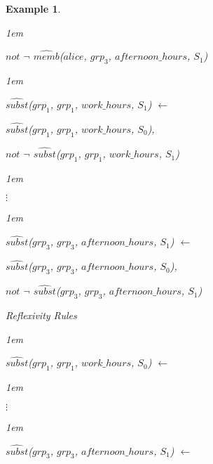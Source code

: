 \documentclass[11pt]{report}
\newtheorem{vexample}{Example}[chapter]
\newenvironment{vquote}
{
  \begin{list}{}{\leftmargin 1em}\item[]
}
{
  \end{list}
}
\begin{document}
\begin{vexample}
\begin{enumerate}
\begin{vquote}
                \hspace{1em}
                $not$ $\lnot$ $\hat{memb}$($alice$, $grp_3$, $afternoon\_hours$, $S_1$)
              \end{vquote}

              \begin{vquote}
                $\hat{subst}$($grp_1$, $grp_1$, $work\_hours$, $S_1$) $\leftarrow$

                \hspace{1em}
                $\hat{subst}$($grp_1$, $grp_1$, $work\_hours$, $S_0$),

                \hspace{1em}
                $not$ $\lnot$ $\hat{subst}$($grp_1$, $grp_1$, $work\_hours$, $S_1$)
              \end{vquote}

              \begin{vquote}
                \hspace{1em}
                $\vdots$
              \end{vquote}

              \begin{vquote}
                $\hat{subst}$($grp_3$, $grp_3$, $afternoon\_hours$, $S_1$) $\leftarrow$

                \hspace{1em}
                $\hat{subst}$($grp_3$, $grp_3$, $afternoon\_hours$, $S_0$),

                \hspace{1em}
                $not$ $\lnot$ $\hat{subst}$($grp_3$, $grp_3$, $afternoon\_hours$, $S_1$)
              \end{vquote}

            \item
              Reflexivity Rules

              \begin{vquote}
                $\hat{subst}$($grp_1$, $grp_1$, $work\_hours$, $S_0$) $\leftarrow$
              \end{vquote}

              \begin{vquote}
                \hspace{1em}
                $\vdots$
              \end{vquote}

              \begin{vquote}
                $\hat{subst}$($grp_3$, $grp_3$, $afternoon\_hours$, $S_1$) $\leftarrow$
              \end{vquote}


\end{enumerate}
\end{vexample}
\end{document}
